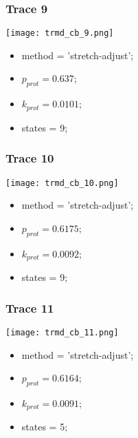 \subsubsection{Trace 9}
\begin{minipage}[c]{0.7\textwidth}
	\texttt{[image: trmd\_cb\_9.png]}
\end{minipage}
\hfill
\begin{minipage}[c]{0.45\textwidth}
	\begin{itemize}
		\item method = 'stretch-adjust';
		\item $p_{prot}=0.637$;
		\item $k_{prot}=0.0101$;
		\item states = 9;
	\end{itemize}
\end{minipage}

\subsubsection{Trace 10}
\begin{minipage}[c]{0.7\textwidth}
	\texttt{[image: trmd\_cb\_10.png]}
\end{minipage}
\hfill
\begin{minipage}[c]{0.45\textwidth}
	\begin{itemize}
		\item method = 'stretch-adjust';
		\item $p_{prot}=0.6175$;
		\item $k_{prot}=0.0092$;
		\item states = 9;
	\end{itemize}
\end{minipage}

\subsubsection{Trace 11}
\begin{minipage}[c]{0.7\textwidth}
	\texttt{[image: trmd\_cb\_11.png]}
\end{minipage}
\hfill
\begin{minipage}[c]{0.45\textwidth}
	\begin{itemize}
		\item method = 'stretch-adjust';
		\item $p_{prot}=0.6164$;
		\item $k_{prot}=0.0091$;
		\item states = 5;
	\end{itemize}
\end{minipage}

